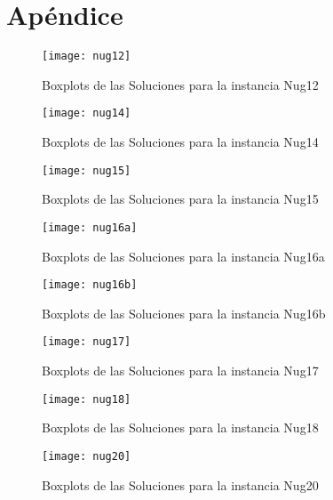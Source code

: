 \documentclass{ci5652}
\begin{document}

\newpage
\section*{Apéndice}

\begin{figure}[ht]
  \caption{Boxplots de las Soluciones para la instancia Nug12}
  \texttt{[image: nug12]}
    \centering
    \label{fig:boxplot_nug12}
\end{figure}

\begin{figure}[ht]
  \caption{Boxplots de las Soluciones para la instancia Nug14}
  \texttt{[image: nug14]}
    \centering
    \label{fig:boxplot_nug14}
\end{figure}

\begin{figure}[ht]
  \caption{Boxplots de las Soluciones para la instancia Nug15}
  \texttt{[image: nug15]}
    \centering
    \label{fig:boxplot_nug15}
\end{figure}

\begin{figure}[ht]
  \caption{Boxplots de las Soluciones para la instancia Nug16a}
  \texttt{[image: nug16a]}
    \centering
    \label{fig:boxplot_nug16a}
\end{figure}

\begin{figure}[ht]
  \caption{Boxplots de las Soluciones para la instancia Nug16b}
  \texttt{[image: nug16b]}
    \centering
    \label{fig:boxplot_nug16b}
\end{figure}

\begin{figure}[ht]
  \caption{Boxplots de las Soluciones para la instancia Nug17}
  \texttt{[image: nug17]}
    \centering
    \label{fig:boxplot_nug17}
\end{figure}

\begin{figure}[ht]
  \caption{Boxplots de las Soluciones para la instancia Nug18}
  \texttt{[image: nug18]}
    \centering
    \label{fig:boxplot_nug18}
\end{figure}

\begin{figure}[ht]
  \caption{Boxplots de las Soluciones para la instancia Nug20}
  \texttt{[image: nug20]}
    \centering
    \label{fig:boxplot_nug20}
\end{figure}
\end{document}
